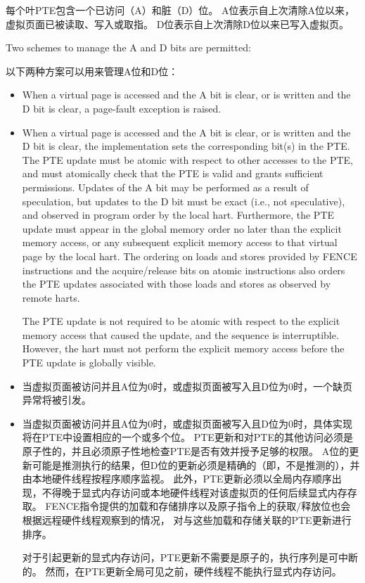 每个叶PTE包含一个已访问（A）和脏（D）位。
A位表示自上次清除A位以来，虚拟页面已被读取、写入或取指。
D位表示自上次清除D位以来已写入虚拟页。

Two schemes to manage the A and D bits are permitted:

以下两种方案可以用来管理A位和D位：

\begin{itemize}
  \item When a virtual page is accessed and the A bit is clear, or is
        written and the D bit is clear, a page-fault exception is raised.
  
  \item When a virtual page is accessed and the A bit is clear, or is
        written and the D bit is clear, the implementation sets the
        corresponding bit(s) in the PTE.  The PTE update must be atomic with
        respect to other accesses to the PTE, and must atomically check
        that the PTE is valid and grants sufficient permissions.  Updates
        of the A bit may be performed as a result of speculation, but updates
        to the D bit must be exact (i.e., not speculative), and observed
        in program order by the local hart.  Furthermore, the PTE update
        must appear in the global memory order no later than the explicit
        memory access, or any subsequent explicit memory access to that
        virtual page by the local hart.  The ordering on loads and stores
        provided by FENCE instructions and the acquire/release bits on atomic
        instructions also orders the PTE updates associated with those loads
        and stores as observed by remote harts.
  
        The PTE update is not required to be atomic with respect to the explicit
        memory access that caused the update, and the sequence is interruptible.
        However, the hart must not perform the explicit memory access before the
        PTE update is globally visible.
\end{itemize}

\begin{itemize}
\item 当虚拟页面被访问并且A位为0时，或虚拟页面被写入且D位为0时，一个缺页异常将被引发。

\item 当虚拟页面被访问并且A位为0时，或虚拟页面被写入且D位为0时，具体实现将在PTE中设置相应的一个或多个位。
PTE更新和对PTE的其他访问必须是原子性的，并且必须原子性地检查PTE是否有效并授予足够的权限。
A位的更新可能是推测执行的结果，但D位的更新必须是精确的（即，不是推测的），并由本地硬件线程按程序顺序监视。
此外，PTE更新必须以全局内存顺序出现，不得晚于显式内存访问或本地硬件线程对该虚拟页的任何后续显式内存存取。
FENCE指令提供的加载和存储排序以及原子指令上的获取/释放位也会根据远程硬件线程观察到的情况，
对与这些加载和存储关联的PTE更新进行排序。

对于引起更新的显式内存访问，PTE更新不需要是原子的，执行序列是可中断的。
然而，在PTE更新全局可见之前，硬件线程不能执行显式内存访问。
\end{itemize}

